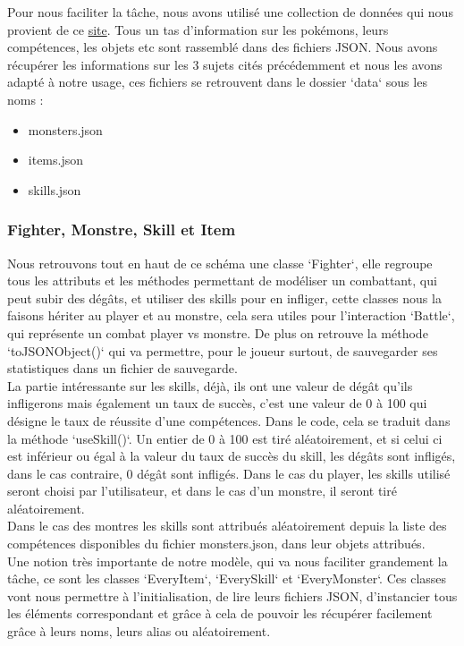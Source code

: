 \documentclass[12pt]{article}
\begin{document}
Pour nous faciliter la tâche, nous avons utilisé une collection de données qui nous provient de ce  \href{https://www.npmjs.com/package/pokemon-assets}{site}. Tous un tas d'information sur les pokémons, leurs compétences, les objets etc sont rassemblé dans des fichiers JSON. Nous avons récupérer les informations sur les 3 sujets cités précédemment et nous les avons adapté à notre usage, ces fichiers se retrouvent dans le dossier `data` sous les noms :\\
\begin{itemize}
    \item monsters.json
    \item items.json
    \item skills.json
\end{itemize}

\subsubsection{Fighter, Monstre, Skill et Item}
Nous retrouvons tout en haut de ce schéma une classe `Fighter`, elle regroupe tous les attributs et les méthodes permettant de modéliser un combattant, qui peut subir des dégâts, et utiliser des skills pour en infliger, cette classes nous la faisons hériter au player et au monstre, cela sera utiles pour l'interaction `Battle`, qui représente un combat player vs monstre. De plus on retrouve la méthode `toJSONObject()` qui va permettre, pour le joueur surtout, de sauvegarder ses statistiques dans un fichier de sauvegarde.\\

La partie intéressante sur les skills, déjà, ils ont une valeur de dégât qu'ils infligerons mais également un taux de succès, c'est une valeur de 0 à 100 qui désigne le taux de réussite d'une compétences. Dans le code, cela se traduit dans la méthode `useSkill()`. Un entier de 0 à 100 est tiré aléatoirement, et si celui ci est inférieur ou égal à la valeur du taux de succès du skill, les dégâts sont infligés, dans le cas contraire, 0 dégât sont infligés. Dans le cas du player, les skills utilisé seront choisi par l'utilisateur, et dans le cas d'un monstre, il seront tiré aléatoirement.\\

Dans le cas des montres les skills sont attribués aléatoirement depuis la liste des compétences disponibles du fichier monsters.json, dans leur objets attribués.\\

Une notion très importante de notre modèle, qui va nous faciliter grandement la tâche, ce sont les classes `EveryItem`, `EverySkill` et `EveryMonster`. Ces classes vont nous permettre à l'initialisation, de lire leurs fichiers JSON, d'instancier tous les éléments correspondant et grâce à cela de pouvoir les récupérer facilement grâce à leurs noms, leurs alias ou aléatoirement. 
\end{document}
